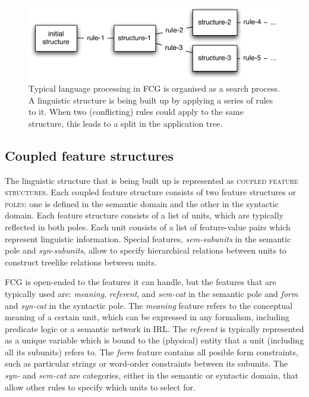 \begin{figure}
  \begin{center}
    \includegraphics[width=.75\textwidth]{./frameworks/figures/fcg-search.pdf}
    \caption[Application of a rule-set]{Typical language processing in
      FCG is organised as a search process. A linguistic structure is
      being built up by applying a series of rules to it. When two
      (conflicting) rules could apply to the same structure, this
      leads to a split in the application tree.}
    \label{f:fcg-search}
  \end{center}
\end{figure}

\subsection{Coupled feature structures}
\label{s:coupled-feature-structures}

The linguistic structure that is being built up is represented as
\textsc{coupled feature structures}. Each coupled feature structure
consists of two feature structures or \textsc{poles}: one is defined in
the semantic domain and the other in the syntactic domain. Each
feature structure consists of a list of units, which are typically
reflected in both poles. Each unit consists of a list of feature-value
pairs which represent linguistic information. Special features,
\emph{sem-subunits} in the semantic pole and \emph{syn-subunits},
allow to specify hierarchical relations between units to construct
treelike relations between units.

FCG is open-ended to the features it can handle, but the features that
are typically used are: \emph{meaning}, \emph{referent}, and
\emph{sem-cat} in the semantic pole and \emph{form} and \emph{syn-cat}
in the syntactic pole. The \emph{meaning} feature refers to the
conceptual meaning of a certain unit, which can be expressed in any
formalism, including predicate logic or a semantic network in IRL. The
\emph{referent} is typically represented as a unique variable which is
bound to the (physical) entity that a unit (including all its
subunits) refers to. The \emph{form} feature contains all posible form
constraints, such as particular strings or word-order constraints
between its subunits. The \emph{syn-} and \emph{sem-cat} are
categories, either in the semantic or syntactic domain, that allow
other rules to specify which units to select for.

